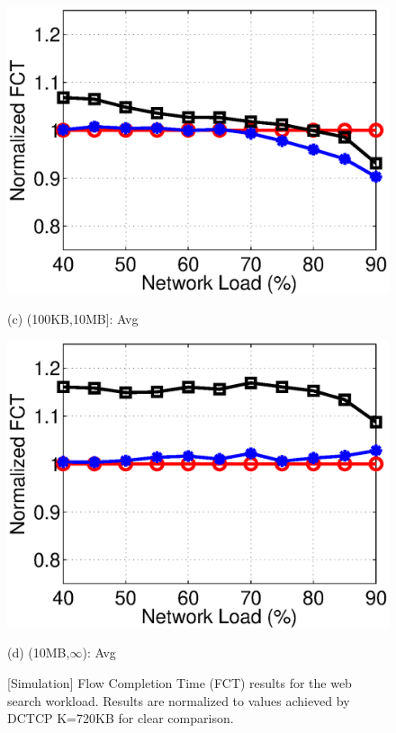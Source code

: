 \begin{figure}[t]
\begin{minipage}{0.245\linewidth}
   \includegraphics[width=1\linewidth]{figs/websearch_medium_avg_fct.eps}
   \centerline{(c) (100KB,10MB]: Avg}
\end{minipage}
\begin{minipage}{0.245\linewidth}
   \includegraphics[width=1\linewidth]{figs/websearch_large_avg_fct.eps}
   \centerline{(d) (10MB,$\infty$): Avg}
\end{minipage}
  \vspace{-2mm}
\caption{[Simulation] Flow Completion Time (FCT) results for the web search workload. Results are normalized to values achieved by DCTCP K=720KB for clear comparison.}\label{fig:websearch_fct}
  \vspace{-3mm}
\end{figure}
